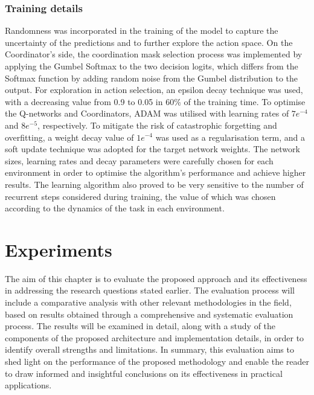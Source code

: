\documentclass[a4paper,singleside,12pt]{report} %
\begin{document}
\subsection{Training details}\label{training-details}
Randomness was incorporated in the training of the model to capture the uncertainty of the predictions and to further explore the action space. On the Coordinator's side, the coordination mask selection process was implemented by applying the Gumbel Softmax to the two decision logits, which differs from the Softmax function by adding random noise from the Gumbel distribution to the output. For exploration in action selection, an epsilon decay technique was used, with a decreasing value from 0.9 to 0.05 in 60\% of the training time. To optimise the Q-networks and Coordinators, ADAM was utilised with learning rates of $7e^{-4}$ and $8e^{-5}$, respectively. To mitigate the risk of catastrophic forgetting and overfitting, a weight decay value of $1e^{-4}$ was used as a regularisation term, and a soft update technique was adopted for the target network weights. The network sizes, learning rates and decay parameters were carefully chosen for each environment in order to optimise the algorithm's performance and achieve higher results. The learning algorithm also proved to be very sensitive to the number of recurrent steps considered during training, the value of which was chosen according to the dynamics of the task in each environment.

\chapter{Experiments}\label{Evaluation}
The aim of this chapter is to evaluate the proposed approach and its effectiveness in addressing the research questions stated earlier. The evaluation process will include a comparative analysis with other relevant methodologies in the field, based on results obtained through a comprehensive and systematic evaluation process. The results will be examined in detail, along with a study of the components of the proposed architecture and implementation details, in order to identify overall strengths and limitations. In summary, this evaluation aims to shed light on the performance of the proposed methodology and enable the reader to draw informed and insightful conclusions on its effectiveness in practical applications.
\end{document}
